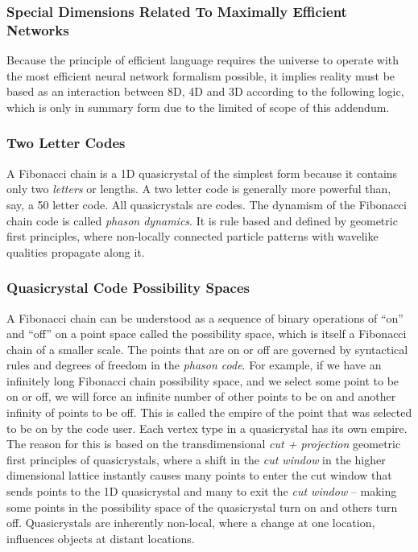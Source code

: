 \documentclass[submission,copyright,creativecommons]{eptcs}
\begin{document}
\subsubsection{Special Dimensions Related To Maximally Efficient Networks}

Because the principle of efficient language requires the universe to operate with the most efficient neural network formalism possible, it implies reality must be based as an interaction between 8D, 4D and 3D according to the following logic, which is only in summary form due to the limited of scope of this addendum.

\subsubsection{Two Letter Codes}

A Fibonacci chain is a 1D quasicrystal of the simplest form because it contains only two \textit{letters} or lengths. A two letter code is generally more powerful than, say, a 50 letter code. All quasicrystals are codes. The dynamism of the Fibonacci chain code is called \textit{phason dynamics}. It is rule based and defined by geometric first principles, where non-locally connected particle patterns with wavelike qualities propagate along it.

\subsubsection{Quasicrystal Code Possibility Spaces}

A Fibonacci chain can be understood as a sequence of binary operations of “on” and “off” on a point space called the possibility space, which is itself a Fibonacci chain of a smaller scale. The points that are on or off are governed by syntactical rules and degrees of freedom in the \textit{phason code}. For example, if we have an infinitely long Fibonacci chain possibility space, and we select some point to be on or off, we will force an infinite number of other points to be on and another infinity of points to be off. This is called the empire of the point that was selected to be on by the code user. Each vertex type in a quasicrystal has its own empire. The reason for this is based on the transdimensional \textit{cut + projection} geometric first principles of quasicrystals, where a shift in the \textit{cut window} in the higher dimensional lattice instantly causes many points to enter the cut window that sends points to the 1D quasicrystal and many to exit the \textit{cut window} -- making some points in the possibility space of the quasicrystal turn on and others turn off. Quasicrystals are inherently non-local, where a change at one location, influences objects at distant locations.
\end{document}
